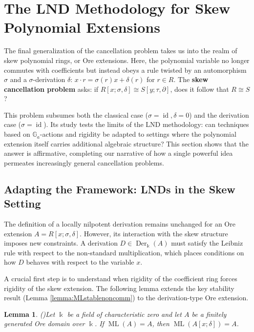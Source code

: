 \documentclass{amsart}
\theoremstyle{plain}
\newtheorem{lemma}[theorem]{Lemma}
\numberwithin{theorem}{section}
\numberwithin{equation}{theorem}
\theoremstyle{definition}
\DeclareMathOperator{\ML}{ML}
\DeclareMathOperator{\Der}{Der}
\begin{document}
\section{The LND Methodology for Skew Polynomial Extensions}
\label{xxsec4} 

The final generalization of the cancellation problem takes us into the realm of skew polynomial rings, or Ore extensions. Here, the polynomial variable no longer commutes with coefficients but instead obeys a rule twisted by an automorphism $\sigma$ and a $\sigma$-derivation $\delta$: $x \cdot r = \sigma(r)x + \delta(r)$ for $r \in R$. The \textbf{skew cancellation problem} asks: if $R[x;\sigma,\delta] \cong S[y;\tau,\partial]$, does it follow that $R \cong S$?

This problem subsumes both the classical case ($\sigma=\operatorname{id}, \delta=0$) and the derivation case ($\sigma=\operatorname{id}$). Its study \cite{AKP, Ber, BHHV, TZZ} tests the limits of the LND methodology: can techniques based on $\mathbb{G}_a$-actions and rigidity be adapted to settings where the polynomial extension itself carries additional algebraic structure? This section shows that the answer is affirmative, completing our narrative of how a single powerful idea permeates increasingly general cancellation problems.

\subsection{Adapting the Framework: LNDs in the Skew Setting}

The definition of a locally nilpotent derivation remains unchanged for an Ore extension $A = R[x;\sigma,\delta]$. However, its interaction with the skew structure imposes new constraints. A derivation $D \in \Der_\Bbbk(A)$ must satisfy the Leibniz rule with respect to the non-standard multiplication, which places conditions on how $D$ behaves with respect to the variable $x$.

A crucial first step is to understand when rigidity of the coefficient ring forces rigidity of the skew extension. The following lemma extends the key stability result (Lemma \ref{lemma:MLstablenoncomm}) to the derivation-type Ore extension.

\begin{lemma}(\cite[Lemma 5.3]{BHHV})\label{lem:ML-stable-skew-der}
Let $\Bbbk$ be a field of characteristic zero and let $A$ be a finitely generated Ore domain over $\Bbbk$. If $\ML(A) = A$, then $\ML(A[x;\delta]) = A$.
\end{lemma}
\end{document}
